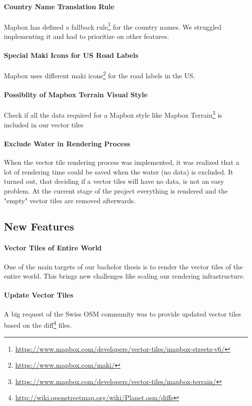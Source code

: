 \paragraph{Country Name Translation Rule}
Mapbox has defined a fallback rule\footnote{\url{https://www.mapbox.com/developers/vector-tiles/mapbox-streets-v6/}} for the country names. We struggled implementing it and had to prioritize on other features.

\paragraph{Special Maki Icons for US Road Labels}
Mapbox uses different maki icons\footnote{\url{https://www.mapbox.com/maki/}} for the road labels in the US.  

\paragraph{Possiblity of Mapbox Terrain Visual Style}
Check if all the data required for a Mapbox style like Mapbox Terrain\footnote{\url{https://www.mapbox.com/developers/vector-tiles/mapbox-terrain/}} is included in our vector tiles

\paragraph{Exclude Water in Rendering Process}

When the vector tile rendering process was implemented, it was realized that a lot of rendering time could be saved
when the water (no data) is excluded.
It turned out, that deciding if a vector tiles will have no data, is not an easy problem. At the current stage of the project
everything is rendered and the "empty" vector tiles are removed afterwards.

\subsection{New Features}\label{new_features}

\paragraph{Vector Tiles of Entire World}
One of the main targets of our bachelor thesis is to render the vector tiles of the entire world. This brings new challenges like scaling our rendering infrastructure. 

\paragraph{Update Vector Tiles}
A big request of the Swiss OSM community was to provide updated vector tiles based on the diff\footnote{\url{http://wiki.openstreetmap.org/wiki/Planet.osm/diffs}} files.

